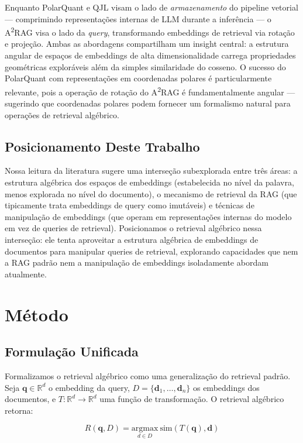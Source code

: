 \documentclass{article}
\begin{document}
Enquanto PolarQuant e QJL visam o lado de \emph{armazenamento} do pipeline vetorial --- comprimindo representações internas de LLM durante a inferência --- o A\textsuperscript{2}RAG visa o lado da \emph{query}, transformando embeddings de retrieval via rotação e projeção. Ambas as abordagens compartilham um insight central: a estrutura angular de espaços de embeddings de alta dimensionalidade carrega propriedades geométricas exploráveis além da simples similaridade do cosseno. O sucesso do PolarQuant com representações em coordenadas polares é particularmente relevante, pois a operação de rotação do A\textsuperscript{2}RAG é fundamentalmente angular --- sugerindo que coordenadas polares podem fornecer um formalismo natural para operações de retrieval algébrico.

\subsection{Posicionamento Deste Trabalho}

Nossa leitura da literatura sugere uma interseção subexplorada entre três áreas: a estrutura algébrica dos espaços de embeddings (estabelecida no nível da palavra, menos explorada no nível do documento), o mecanismo de retrieval da RAG (que tipicamente trata embeddings de query como imutáveis) e técnicas de manipulação de embeddings (que operam em representações internas do modelo em vez de queries de retrieval). Posicionamos o retrieval algébrico nessa interseção: ele tenta aproveitar a estrutura algébrica de embeddings de documentos para manipular queries de retrieval, explorando capacidades que nem a RAG padrão nem a manipulação de embeddings isoladamente abordam atualmente.

\section{Método}

\subsection{Formulação Unificada}

Formalizamos o retrieval algébrico como uma generalização do retrieval padrão. Seja $\mathbf{q} \in \mathbb{R}^d$ o embedding da query, $D = \{\mathbf{d}_1, \ldots, \mathbf{d}_n\}$ os embeddings dos documentos, e $T : \mathbb{R}^d \to \mathbb{R}^d$ uma função de transformação. O retrieval algébrico retorna:

\begin{equation}
R(\mathbf{q}, D) = \underset{d \in D}{\text{argmax}} \ \text{sim}(T(\mathbf{q}), \mathbf{d})
\end{equation}
\end{document}
